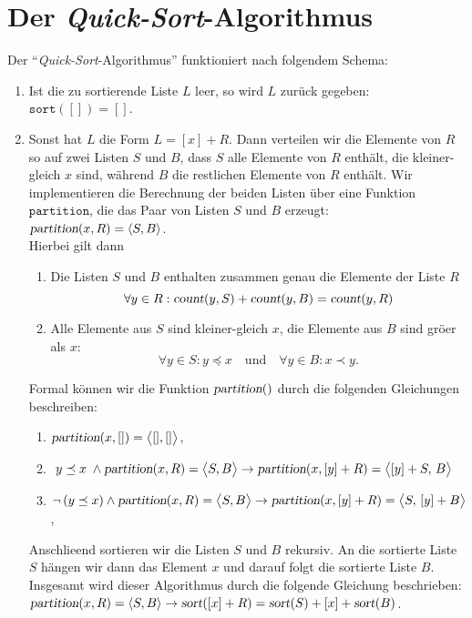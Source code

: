 \section{Der \emph{Quick-Sort}-Algorithmus}
Der ``\emph{Quick-Sort}-Algorithmus'' funktioniert nach folgendem Schema:
\begin{enumerate}
\item Ist die zu sortierende Liste $L$ leer, so wird $L$
      zur\"uck gegeben: \\[0.2cm]
      \hspace*{1.3cm} $\mathtt{sort}([]) = []$.
\item Sonst hat $L$ die Form $L = [x] + R$.
      Dann verteilen wir die Elemente von $R$ so auf zwei Listen $S$ und $B$, 
      dass $S$ alle Elemente von $R$ enth\"alt, die kleiner-gleich $x$ sind, w\"ahrend $B$ die
      restlichen Elemente von $R$ enth\"alt. 
      Wir implementieren die Berechnung der beiden Listen \"uber eine Funktion
      $\mathtt{partition}$, die das Paar von Listen $S$ und $B$ erzeugt: 
      \\[0.2cm]
      \hspace*{1.3cm}
      $\textsl{partition}(x,R) = \langle S,B \rangle$.
      \\[0.2cm]
      Hierbei gilt dann 
      \begin{enumerate}
      \item Die Listen $S$ und $B$ enthalten zusammen genau die Elemente der Liste $R$
            \[ \forall y \in R: \textsl{count}(y,S) + \textsl{count}(y,B) = \textsl{count}(y,R) \]
      \item Alle Elemente aus $S$ sind kleiner-gleich $x$, die Elemente aus $B$ sind
            gr\"o\3er als $x$:
            \[ \forall y \in S: y \preceq x \quad \mbox{und} \quad \forall y \in B: x \prec y. \]
      \end{enumerate}
      Formal k\"onnen wir die Funktion $\textsl{partition}()$ durch die folgenden
      Gleichungen beschreiben:
      \begin{enumerate}
      \item $\textsl{partition}(x, []) = \bigl\langle[], []\bigr\rangle$,
      \item \quad 
            $\; y \preceq x\; \wedge \textsl{partition}(x,R) = \bigl\langle S, B \bigr\rangle \rightarrow 
             \textsl{partition}(x, [y] + R) = \bigl\langle [y] + S,\, B \bigr\rangle$
      \item $\neg\, (y \preceq x) \wedge \textsl{partition}(x,R) = \bigl\langle S, B \bigr\rangle \rightarrow 
             \textsl{partition}(x, [y] + R) = \bigl\langle S,\, [y] + B \bigr\rangle$,
      \end{enumerate}
      Anschlie\3end sortieren wir die Listen $S$ und $B$ rekursiv.
      An die sortierte Liste $S$ h\"angen wir dann das Element $x$ und darauf folgt die
      sortierte Liste $B$.  Insgesamt wird dieser Algorithmus durch die folgende Gleichung
      beschrieben:
      \\[0.2cm]
      \hspace*{1.3cm}
      $\textsl{partition}(x,R) = \langle S,B \rangle \rightarrow 
       \textsl{sort}([x] + R) = \textsl{sort}(S) + [x] + \textsl{sort}(B)$.
\end{enumerate}
